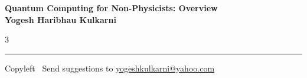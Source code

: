 \documentclass[8pt,landscape]{article}
\begin{document}
\footnotesize

\begin{center}
\Large{\textbf{Quantum Computing for Non-Physicists: Overview\\ Yogesh Haribhau Kulkarni}}
\end{center}

\begin{multicols}{3}

\end{multicols}

\rule{\linewidth}{0.25pt}
\scriptsize
Copyleft \textcopyleft\  Send suggestions to
\href{http://www.yogeshkulkarni.com}{yogeshkulkarni@yahoo.com}
\end{document}
